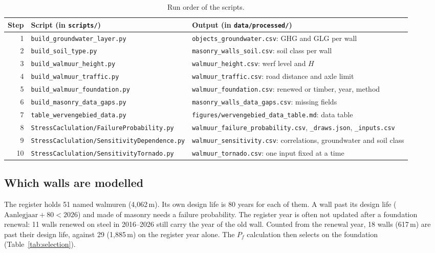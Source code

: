 \begin{table}[htbp]
\centering
\small
\caption{Run order of the scripts.}
\label{tab:run-order}
\begin{tabularx}{\textwidth}{@{}r l >{\raggedright\arraybackslash}X@{}}
\toprule
Step & Script (in \texttt{scripts/}) & Output (in \texttt{data/processed/}) \\
\midrule
1 & \texttt{build\_groundwater\_layer.py} & \texttt{objects\_groundwater.csv}: GHG and GLG per wall \\
2 & \texttt{build\_soil\_type.py} & \texttt{masonry\_walls\_soil.csv}: soil class per wall \\
3 & \texttt{build\_walmuur\_height.py} & \texttt{walmuur\_height.csv}: werf level and $H$ \\
4 & \texttt{build\_walmuur\_traffic.py} & \texttt{walmuur\_traffic.csv}: road distance and axle limit \\
5 & \texttt{build\_walmuur\_foundation.py} & \texttt{walmuur\_foundation.csv}: renewed or timber, year, method \\
6 & \texttt{build\_masonry\_data\_gaps.py} & \texttt{masonry\_walls\_data\_gaps.csv}: missing fields \\
7 & \texttt{table\_wervengebied\_data.py} & \texttt{figures/wervengebied\_data\_table.md}: data table \\
8 & \texttt{StressCaclulation/FailureProbability.py} & \texttt{walmuur\_failure\_probability.csv}, \texttt{\_draws.json}, \texttt{\_inputs.csv} \\
9 & \texttt{StressCaclulation/SensitivityDependence.py} & \texttt{walmuur\_sensitivity.csv}: correlations, groundwater and soil class \\
10 & \texttt{StressCaclulation/SensitivityTornado.py} & \texttt{walmuur\_tornado.csv}: one input fixed at a time \\
\bottomrule
\end{tabularx}
\end{table}

\subsection{Which walls are modelled}\label{app:data-selection}

The register holds 51 named walmuren (4{,}062\,m). Its own design life is
80 years for each of them. A wall past its design life ($\text{Aanlegjaar} + 80
< 2026$) and made of masonry needs a failure probability. The register year is
often not updated after a foundation renewal: 11 walls renewed on steel in
2016--2026 still carry the year of the old wall. Counted from the renewal
year, 18 walls (617\,m) are past their design life, against 29 (1{,}885\,m) on
the register year alone. The $P_f$ calculation then selects on the
foundation (Table~\ref{tab:selection}).

